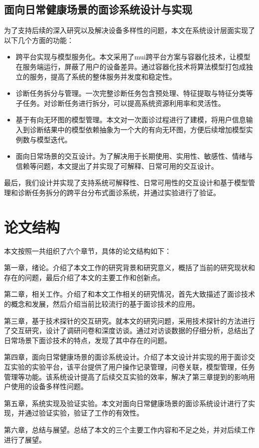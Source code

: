 
\subsection{面向日常健康场景的面诊系统设计与实现}

为了支持后续的深入研究以及解决设备多样性的问题，本文在系统设计层面实现了以下几个方面的功能：

\begin{itemize}

    \item 跨平台实现与模型服务化。本文采用了mui跨平台方案与容器化技术，让模型在服务端运行，屏蔽了用户的设备差异。通过容器化技术将算法模型打包成独立的服务，提高了系统的整体服务并发度和稳定性。

    \item 诊断任务拆分与管理。一次完整诊断任务包含预处理、特征提取与特征分类等子任务。对诊断任务进行拆分，可以提高系统资源利用率和灵活性。
    
    \item 基于有向无环图的模型管理。本文对一次面诊过程进行了建模，将用户信息输入到诊断结果中的模型依赖抽象为一个大的有向无环图，方便后续增加模型实例数与模型迭代。
    
    \item 面向日常场景的交互设计。为了解决用于长期使用、实用性、敏感性、情绪与信赖等问题，本文提出了并实现了可解释、日常可用的交互设计。

\end{itemize}

最后，我们设计并实现了支持系统可解释性、日常可用性的交互设计和基于模型管理和诊断任务拆分的跨平台分布式面诊系统，并通过实验进行了验证。

\section{论文结构}
本文按照一共组织了六个章节，具体的论文结构如下：

第一章，绪论。介绍了本文工作的研究背景和研究意义，概括了当前的研究现状和存在的问题，最后介绍了本文的主要工作和创新点。

第二章，相关工作。介绍了和本文工作相关的研究情况，首先大致描述了面诊技术的概念和发展，然后介绍当前比较流行的基于面诊技术的应用。

第三章，基于技术探针的交互研究。就本文的研究问题，采用技术探针的方法进行了交互研究，设计了调研问卷和深度访谈。通过对访谈数据的仔细分析，总结出了日常场景下面诊技术的特点，发现了其中存在的问题。

第四章，面向日常健康场景的面诊系统设计。介绍了本文设计并实现的用于面诊交互实验的实验平台，该平台提供了用户操作记录管理，问卷关联，模型管理，任务管理等功能。该系统设计提高了后续交互实验的效率，解决了第三章提到的影响用户使用的设备多样性问题。

第五章，系统实现及验证实验。本文对面向日常健康场景的面诊系统设计进行了实现，并通过验证实验，验证了工作的有效性。

第六章，总结与展望。总结了本文的三个主要工作内容和不足之处，并对后续工作进行了展望。